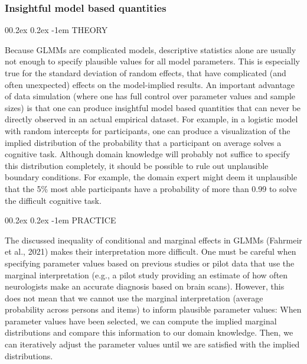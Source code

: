\documentclass[
  man,floatsintext]{apa6}
\makeatletter
\let\oldparagraph\paragraph
\renewcommand{\paragraph}[1]{\oldparagraph{#1}\mbox{}}
\renewcommand{\paragraph}{\@startsection{paragraph}{4}{\parindent}%
  {0\baselineskip \@plus 0.2ex \@minus 0.2ex}%
  {-1em}%
  {\normalfont\normalsize\bfseries\itshape\typesectitle}}
\makeatother
\begin{document}
\hypertarget{insightful-model-based-quantities}{%
\subsubsection{Insightful model based quantities}\label{insightful-model-based-quantities}}

\hypertarget{theory-4}{%
\paragraph{THEORY}\label{theory-4}}

Because GLMMs are complicated models, descriptive statistics alone are usually not enough to specify plausible values for all model parameters.
This is especially true for the standard deviation of random effects, that have complicated (and often unexpected) effects on the model-implied results.
An important advantage of data simulation (where one has full control over parameter values and sample sizes) is that one can produce insightful model based quantities that can never be directly observed in an actual empirical dataset.
For example, in a logistic model with random intercepts for participants, one can produce a visualization of the implied distribution of the probability that a participant on average solves a cognitive task.
Although domain knowledge will probably not suffice to specify this distribution completely, it should be possible to rule out unplausible boundary conditions.
For example, the domain expert might deem it unplausible that the 5\% most able participants have a probability of more than 0.99 to solve the difficult cognitive task.

\hypertarget{practice-4}{%
\paragraph{PRACTICE}\label{practice-4}}

The discussed inequality of conditional and marginal effects in GLMMs (Fahrmeir et al., 2021) makes their interpretation more difficult.
One must be careful when specifying parameter values based on previous studies or pilot data that use the marginal interpretation (e.g., a pilot study providing an estimate of how often neurologists make an accurate diagnosis based on brain scans).
However, this does not mean that we cannot use the marginal interpretation (average probability across persons and items) to inform plausible parameter values: When parameter values have been selected, we can compute the implied marginal distributions and compare this information to our domain knowledge.
Then, we can iteratively adjust the parameter values until we are satisfied with the implied distributions.
\end{document}

